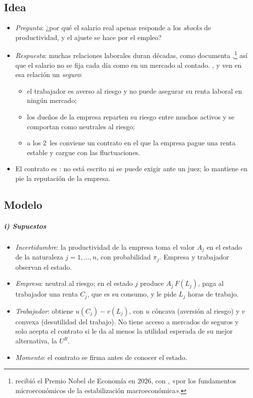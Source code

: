 \documentclass[11pt]{article}
\begin{document}
\subsection{Idea}\label{sec:contratos-implicitos-idea}

\begin{itemize}
\item \emph{Pregunta}: ¿por qué el salario real apenas responde a los \emph{shocks} de productividad, y el ajuste se hace por el empleo?
\item \emph{Respuesta}: muchas relaciones laborales duran décadas, como documenta \textcite{Hall1982Importance},\footnote{ recibió el Premio Nobel de Economía en 2026, con , «por los fundamentos microeconómicos de la estabilización macroeconómica»\nocite{Nobel2026Prensa}.} así que el salario no se fija cada día como en un mercado al contado. \textcite{Baily1974Wages}, \textcite{Gordon1974Neoclassical} y \textcite{Azariadis1975Implicit} ven en esa relación un \emph{seguro}:
  \begin{itemize}
  \item el trabajador es averso al riesgo y no puede asegurar su renta laboral en ningún mercado;
  \item los dueños de la empresa reparten su riesgo entre muchos activos y se comportan como neutrales al riesgo;
  \item a los 2~les conviene un contrato en el que la empresa pague una renta estable y cargue con las fluctuaciones.
  \end{itemize}
\item El contrato es : no está escrito ni se puede exigir ante un juez; lo mantiene en pie la reputación de la empresa.
\end{itemize}

\subsection{Modelo}\label{sec:contratos-implicitos-modelo}

\subparagraph{i) Supuestos}

\begin{itemize}
\item \emph{Incertidumbre}: la productividad de la empresa toma el valor $A_j$ en el estado de la naturaleza $j=1,\dots,n$, con probabilidad $\pi_j$. Empresa y trabajador observan el estado.
\item \emph{Empresa}: neutral al riesgo; en el estado $j$ produce $A_j\,F(L_j)$, paga al trabajador una renta $C_j$, que es su consumo, y le pide $L_j$ horas de trabajo.
\item \emph{Trabajador}: obtiene $u(C_j)-v(L_j)$, con $u$ cóncava (aversión al riesgo) y $v$ convexa (desutilidad del trabajo). No tiene acceso a mercados de seguros y solo acepta el contrato si le da al menos la utilidad esperada de su mejor alternativa, la  $U^R$.
\item \emph{Momento}: el contrato se firma antes de conocer el estado.
\end{itemize}
\end{document}
